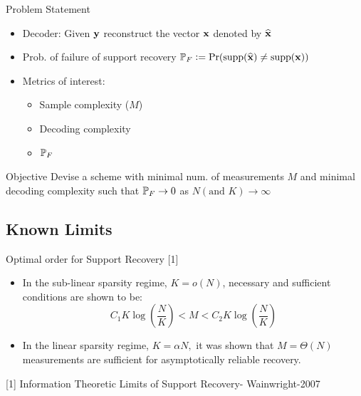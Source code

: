 \documentclass[10pt]{beamer}
\begin{document}
\begin{frame}{Problem Statement}
\begin{itemize}
\item Decoder: Given $\mathbf{y}$ reconstruct the vector $\mathbf{x}$ denoted by $\widehat{\mathbf{x}}$
\item Prob. of failure of support recovery $\mathbb{P}_{F}\mathrel{\mathop:}= \text{Pr}(\text{supp}(\widehat{\mathbf{x}})\neq \text{supp}(\mathbf{x}))$
\item Metrics of interest:
\begin{itemize}
\item Sample complexity ($M$)
\item Decoding complexity
\item $\mathbb{P}_{F}$
\end{itemize} 
\end{itemize}
\vspace{5ex}

\begin{block}{Objective}
Devise a scheme with minimal num. of measurements $M$ and minimal decoding complexity such that $\mathbb{P}_{F}\rightarrow 0$ as $N (\text{and } K) \rightarrow \infty$
\end{block}
\end{frame}

\subsection{Known Limits}
\begin{frame}
\begin{block}{Optimal order for Support Recovery [1]}
\begin{itemize}
\item In the sub-linear sparsity regime, $K=o(N)$, necessary and sufficient conditions are shown to be:
\begin{equation*}
C_1 K\log\left(\frac{N}{K}\right)<M<C_2 K\log\left(\frac{N}{K}\right)
\end{equation*}
\item In the linear sparsity regime, $K=\alpha N,$ it was shown that $M=\Theta(N)$ measurements are sufficient for asymptotically reliable recovery. 
 \end{itemize}
\end{block}
\vspace{7ex}


[1] Information Theoretic Limits of Support Recovery- Wainwright-2007
\end{frame}
\end{document}
